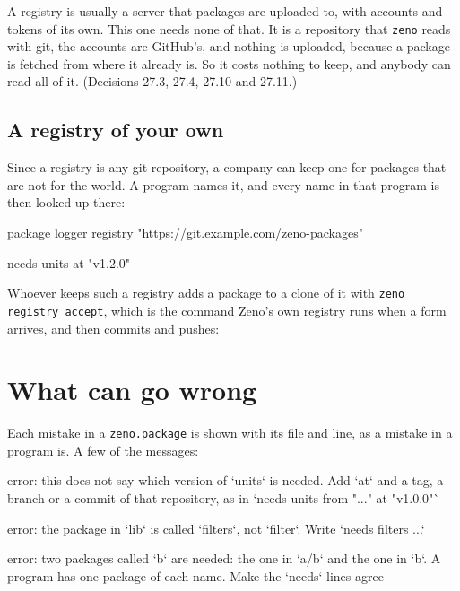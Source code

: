 \begin{why}
A registry is usually a server that packages are uploaded to, with
accounts and tokens of its own. This one needs none of that. It is a
repository that \verb|zeno| reads with git, the accounts are GitHub's,
and nothing is uploaded, because a package is fetched from where it
already is. So it costs nothing to keep, and anybody can read all of
it. (Decisions 27.3, 27.4, 27.10 and 27.11.)
\end{why}

\subsection{A registry of your own}

Since a registry is any git repository, a company can keep one for
packages that are not for the world. A program names it, and every
name in that program is then looked up there:

\begin{zenofrag}[lang=shell]
package logger
registry "https://git.example.com/zeno-packages"

needs units at "v1.2.0"
\end{zenofrag}

Whoever keeps such a registry adds a package to a clone of it with
\verb|zeno registry accept|, which is the command Zeno's own registry
runs when a form arrives, and then commits and pushes:


\section{What can go wrong}

Each mistake in a \verb|zeno.package| is shown with its file and line,
as a mistake in a program is. A few of the messages:

\begin{zenofrag}[lang=shell]
error: this does not say which version of `units` is needed. Add `at` and a tag,
a branch or a commit of that repository, as in `needs units from "..." at "v1.0.0"`

error: the package in `lib` is called `filters`, not `filter`. Write `needs filters ...`

error: two packages called `b` are needed: the one in `a/b` and the one in `b`.
A program has one package of each name. Make the `needs` lines agree
\end{zenofrag}


